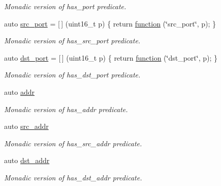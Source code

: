 \begin{DoxyCompactItemize}
\begin{DoxyCompactList}\small\item\em Monadic version of {\ttfamily has\+\_\+port} predicate. \end{DoxyCompactList}\item 
auto \hyperlink{namespacepfq_1_1lang_1_1anonymous__namespace_02default_8hpp_03_ad1645151270994a4f396565b70233b73}{src\+\_\+port} = \mbox{[}$\,$\mbox{]} (uint16\+\_\+t p) \{ return \hyperlink{namespacepfq_1_1lang_a1a4638059d700ae08d0ca63886ff2bb3}{function} (\char`\"{}src\+\_\+port\char`\"{}, p); \}
\begin{DoxyCompactList}\small\item\em Monadic version of {\ttfamily has\+\_\+src\+\_\+port} predicate. \end{DoxyCompactList}\item 
auto \hyperlink{namespacepfq_1_1lang_1_1anonymous__namespace_02default_8hpp_03_a25a3b35caf255c109a6c5b4f601b1b61}{dst\+\_\+port} = \mbox{[}$\,$\mbox{]} (uint16\+\_\+t p) \{ return \hyperlink{namespacepfq_1_1lang_a1a4638059d700ae08d0ca63886ff2bb3}{function} (\char`\"{}dst\+\_\+port\char`\"{}, p); \}
\begin{DoxyCompactList}\small\item\em Monadic version of {\ttfamily has\+\_\+dst\+\_\+port} predicate. \end{DoxyCompactList}\item 
auto \hyperlink{namespacepfq_1_1lang_1_1anonymous__namespace_02default_8hpp_03_a13cabe468839119d8d68540e3c60718b}{addr}
\begin{DoxyCompactList}\small\item\em Monadic version of {\ttfamily has\+\_\+addr} predicate. \end{DoxyCompactList}\item 
auto \hyperlink{namespacepfq_1_1lang_1_1anonymous__namespace_02default_8hpp_03_a2ee09b5a65a64d60bc797b2ecd1c8a4a}{src\+\_\+addr}
\begin{DoxyCompactList}\small\item\em Monadic version of {\ttfamily has\+\_\+src\+\_\+addr} predicate. \end{DoxyCompactList}\item 
auto \hyperlink{namespacepfq_1_1lang_1_1anonymous__namespace_02default_8hpp_03_a3f51de44baa33ff19a94995945636072}{dst\+\_\+addr}
\begin{DoxyCompactList}\small\item\em Monadic version of {\ttfamily has\+\_\+dst\+\_\+addr} predicate. \end{DoxyCompactList}\item 

\end{DoxyCompactItemize}
